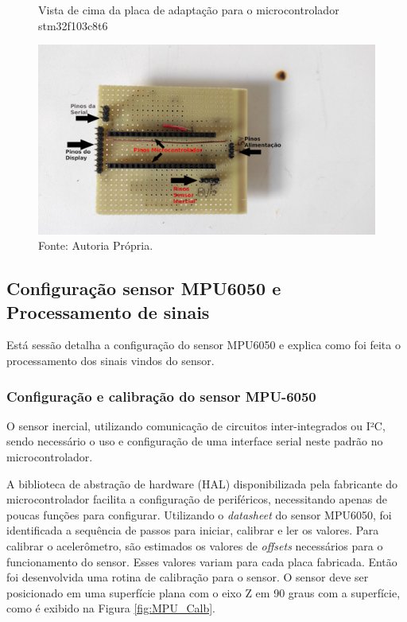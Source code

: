 \begin{figure}[H]
	\vspace{4mm}
	\centering
	\caption{Vista de cima da placa de adaptação para o microcontrolador stm32f103c8t6}
	\label{fig:placa1}
	\includegraphics[scale=0.5, trim={2.5cm 3cm 8cm 4cm}, clip]{imagens/placa1}	
	\caption*{Fonte: Autoria Própria.}
\end{figure}

\subsection{Configuração sensor MPU6050 e Processamento de sinais}
Está sessão detalha a configuração do sensor MPU6050 e explica como foi feita o processamento dos sinais vindos do sensor. 	
\subsubsection{Configuração e calibração do sensor MPU-6050}
O sensor inercial, utilizando comunicação de circuitos inter-integrados ou I²C, sendo necessário o uso e configuração de uma interface serial neste padrão no microcontrolador.

 A biblioteca de abstração de hardware (HAL) disponibilizada pela fabricante do microcontrolador facilita a configuração de periféricos, necessitando apenas de poucas funções para configurar. Utilizando o \textit{datasheet} do sensor MPU6050, foi identificada a sequência de passos para iniciar, calibrar e ler os valores. Para calibrar o acelerômetro, são estimados os valores de \textit{offsets} necessários para o funcionamento do sensor. Esses valores variam para cada placa fabricada. Então foi desenvolvida uma rotina de calibração para o sensor. O sensor deve ser posicionado em uma superfície plana com o eixo Z em 90 graus com a superfície, como é exibido na Figura \ref{fig:MPU_Calb}.

